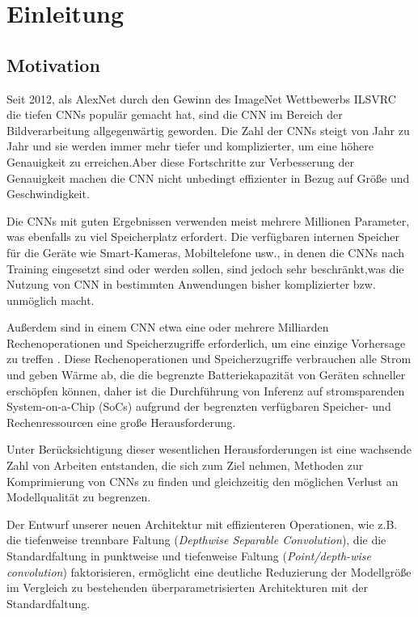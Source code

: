 \documentclass[12pt,a4paper]{scrartcl}
\numberwithin{equation}{section}
\begin{document}
\section{Einleitung}
\subsection{Motivation}\label{motivation}
Seit 2012, als AlexNet \cite{AlexNet} durch den Gewinn des ImageNet Wettbewerbs \ac{ILSVRC} die tiefen \acsp{CNN} populär gemacht hat, sind die \acs{CNN} im Bereich der Bildverarbeitung allgegenwärtig geworden. Die Zahl der CNNs steigt von Jahr zu Jahr und sie werden immer mehr tiefer und komplizierter, um eine höhere Genauigkeit zu erreichen.Aber diese Fortschritte zur Verbesserung der Genauigkeit machen die CNN nicht unbedingt effizienter in Bezug auf Größe und Geschwindigkeit.

Die \acsp{CNN} mit guten Ergebnissen verwenden  meist mehrere Millionen Parameter, was ebenfalls zu viel Speicherplatz erfordert. Die verfügbaren internen Speicher für die Geräte wie Smart-Kameras, Mobiltelefone usw., in denen die CNNs nach Training eingesetzt sind oder werden sollen, sind jedoch sehr beschränkt,was die Nutzung von CNN in bestimmten Anwendungen bisher komplizierter bzw. unmöglich macht. 

Außerdem sind in einem CNN  etwa eine oder mehrere Milliarden Rechenoperationen und Speicherzugriffe erforderlich, um eine einzige Vorhersage zu treffen \cite{prunetoprune}. Diese Rechenoperationen und Speicherzugriffe verbrauchen alle Strom und geben Wärme ab, die die begrenzte Batteriekapazität von Geräten schneller erschöpfen können, daher ist die Durchführung von Inferenz auf stromsparenden System-on-a-Chip (SoCs) aufgrund der begrenzten verfügbaren Speicher- und Rechenressourcen eine große Herausforderung.

Unter Berücksichtigung dieser wesentlichen Herausforderungen ist eine wachsende Zahl von Arbeiten entstanden, die sich zum Ziel nehmen, Methoden zur Komprimierung von \acsp{CNN} zu finden und gleichzeitig den möglichen Verlust an Modellqualität zu begrenzen.

Der Entwurf unserer neuen Architektur mit effizienteren Operationen, wie z.B. die tiefenweise trennbare Faltung (\textit{Depthwise Separable Convolution}), die die Standardfaltung in punktweise und tiefenweise Faltung (\textit{Point/depth-wise convolution}) faktorisieren, ermöglicht eine deutliche Reduzierung der Modellgröße im Vergleich zu bestehenden überparametrisierten Architekturen mit der Standardfaltung.
\end{document}
